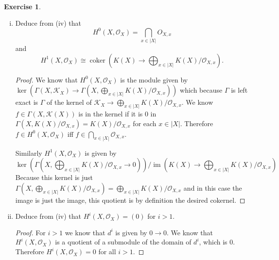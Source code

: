 \documentclass{article}
\newcommand{\sheaf}{\mathcal{O}}
\DeclareMathOperator{\im}{im}
\DeclareMathOperator{\coker}{coker}
\newcommand{\ff}{\mathcal{K}}
\theoremstyle{definition}
\newtheorem{question}{Exercise}
\begin{document}
\begin{question}
\begin{enumerate}[(i), resume]
\begin{proof}
                  This shows this sheaf is flasque.

                  We easily see it is a resolution because it is an exact
                  sequence.
              \end{proof}

        \item Deduce from (iv) that
              \[
                  H^{0}(X,\sheaf_{X})=\bigcap_{x\in|X|}O_{X,x}
              \]
              and
              \[
                  H^{1}(X,\sheaf_{X})\cong\coker(K(X)\to\bigoplus_{x\in|X|}K(X)/\sheaf_{X,x}).
              \]

              \begin{proof}
                  We know that \(H^{0}(X,\sheaf_{X})\) is the module given by
                  \(\ker
                  (\Gamma(X,\ff_{X})\to\Gamma(X,\bigoplus_{x\in|X|}K(X)/\sheaf_{X,x}))\)
                  which because \(\Gamma\) is left exact is \(\Gamma\) of the
                  kernel of \(\ff_{X}\to\bigoplus_{x\in|X|}K(X)/\sheaf_{X,x}\).
                  We know \(f\in\Gamma(X,\ff(X))\) is in the kernel if it is
                  \(0\) in \(\Gamma(X,K(X)/\sheaf_{X,x})=K(X)/\sheaf_{X,x}\) for
                  each \(x\in |X|\). Therefore \(f\in H^{0}(X,\sheaf_{X})\) iff
                  \(f\in\bigcap_{x\in |X|}\sheaf_{X,x}\).

                  Similarly \(H^{1}(X,\sheaf_{X})\) is given by
                  \[
                      \ker\left(\Gamma\left(X,\bigoplus_{x\in|X|}K(X)/\sheaf_{X,x}\to 0\right)\right)/\im \left(K(X)\to\bigoplus_{x\in|X|}K(X)/\sheaf_{X,x}\right)
                  \]
                  Because this kernel is just
                  \(\Gamma(X,\bigoplus_{x\in|X|}K(X)/\sheaf_{X,x})=\bigoplus_{x\in|X|}K(X)/\sheaf_{X,x}\)
                  and in this case the image is just the image, this quotient is
                  by definition the desired cokernel.
              \end{proof}

        \item Deduce from (iv) that \(H^{i}(X,\sheaf_{X})=(0)\) for \(i>1\).

              \begin{proof}
                  For \(i>1\) we know that \(d^{i}\) is given by \(0\to 0\). We
                  know that \(H^{i}(X,\sheaf_{X})\) is a quotient of a submodule
                  of the domain of \(d^{i}\), which is \(0\). Therefore
                  \(H^{i}(X,\sheaf_{X})=0\) for all \(i>1\).
              \end{proof}
    \end{enumerate}
\end{question}
\end{document}
